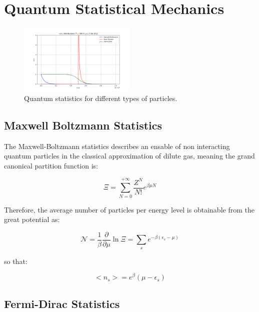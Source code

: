 \documentclass{article}
\begin{document}
\newpage

\section{Quantum Statistical Mechanics}

\begin{figure}[h]
    \centering
    \includegraphics[width=0.5\textwidth]{images/n-distributions.png}
    \caption{Quantum statistics for different types of particles.}
    \label{fig:quantum-statistics}
\end{figure}

\subsection{Maxwell Boltzmann Statistics}

The Maxwell-Boltzmann statistics describes an ensable of non interacting quantum particles in the classical
approximation of dilute gas, meaning the grand canonical partition function is:

\begin{equation}
    \Xi=\sum_{N=0}^{+\infty}\frac{Z^N}{N!}e^{\beta\mu N}
\end{equation}

Therefore, the average number of particles per energy level is obtainable from the great potential as:

\begin{equation}
    \mathcal{N}=\frac{1}{\beta}\frac{\partial}{\partial \mu}\ln{\Xi}=\sum_{s} e^{-\beta(\epsilon_s-\mu)}
\end{equation}

so that:

\begin{equation}
    <n_s>=e^\beta(\mu-\epsilon_s)
\end{equation}


\subsection{Fermi-Dirac Statistics}
\end{document}
